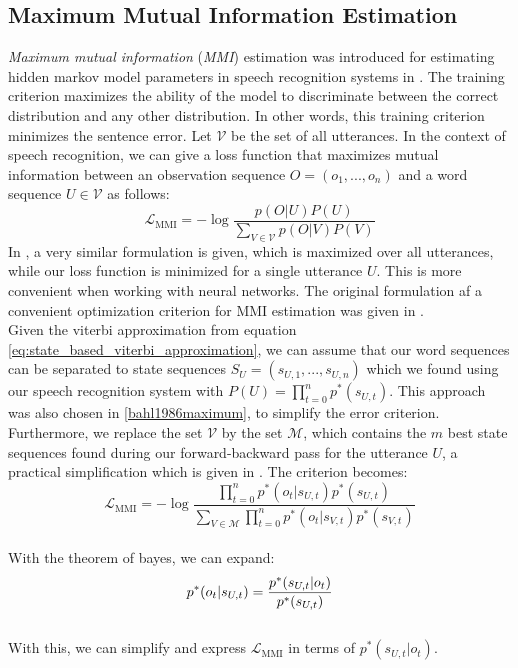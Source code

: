 \subsection{Maximum Mutual Information Estimation}
\label{sec:mmie}
\textit{Maximum mutual information} (\textit{MMI}) estimation was introduced for estimating hidden markov model parameters in speech recognition systems in \cite{bahl1986maximum}. The training criterion maximizes the ability of the model to discriminate between the correct distribution and any other distribution. In other words, this training criterion minimizes the sentence error. Let $\mathcal{V}$ be the set of all utterances. In the context of speech recognition, we can give a loss function that maximizes mutual information between an observation sequence $O = (o_1, ..., o_n)$ and a word sequence $U \in \mathcal{V}$ as follows:
\[
\mathcal{L}_{\text{MMI}} = -\log\frac{p(O|U)P(U)}{\sum_{V \in \mathcal{V}} p(O|V)P(V)} 
\]
In \cite{ghoshal2013sequence}, a very similar formulation is given, which is maximized over all utterances, while our loss function is minimized for a single utterance $U$. This is more convenient when working with neural networks. The original formulation af a convenient optimization criterion for MMI estimation was given in \cite{schluter1998comparison}.\\
Given the viterbi approximation from equation \ref{eq:state_based_viterbi_approximation}, we can assume that our word sequences can be separated to state sequences $S_U = (s_{U,1},...,s_{U,n})$ which we found using our speech recognition system with $P(U) = \prod_{t = 0}^{n} p^*(s_{U,t})$. This approach was also chosen in \ref{bahl1986maximum}, to simplify the error criterion. Furthermore, we replace the set $\mathcal{V}$ by the set $\mathcal{M}$, which contains the $m$ best state sequences found during our forward-backward pass for the utterance $U$, a practical simplification which is given in \cite{schluter1998comparison}. The criterion becomes: 
\\ 
\[
\mathcal{L}_{\text{MMI}} = -\log\frac{\prod_{t = 0}^{n} p^*(o_{t}|s_{U,t})p^*(s_{U,t})}{\sum_{V \in \mathcal{M}} \prod_{t = 0}^{n} p^*(o_{t}|s_{V,t})p^*(s_{V,t})} 
\] \\
With the theorem of bayes, we can expand:
\[ \\
p^*(o_{t}|s_{U,t}) = \frac{p^*(s_{U,t}|o_{t})}{p^*(s_{U,t})}
\] \\
With this, we can simplify and express $\mathcal{L}_{\text{MMI}}$ in terms of $p^*(s_{U,t}|o_{t})$. \\
